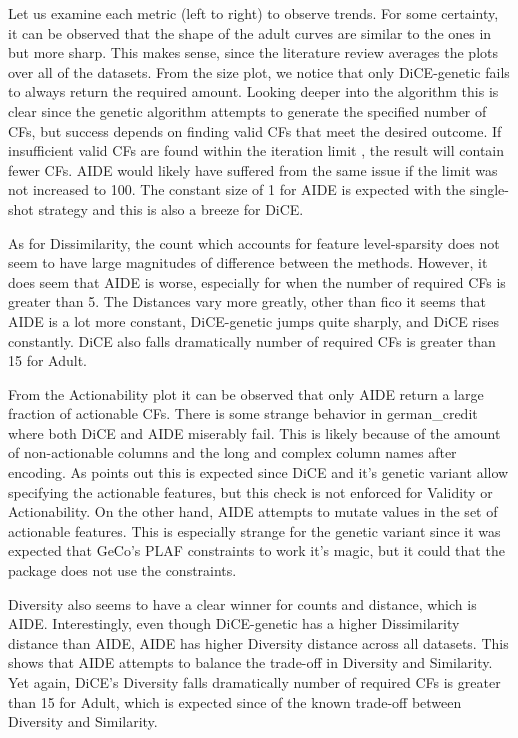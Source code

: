 Let us examine each metric (left to right) to observe trends. For some certainty, it can be observed that the shape of the adult curves are similar to the ones in \citet{guidotti2024counterfactual} but more sharp. This makes sense, since the literature review averages the plots over all of the datasets. From the size plot, we notice that only DiCE-genetic fails to always return the required amount. Looking deeper into the algorithm this is clear since the genetic algorithm attempts to generate the specified number of CFs, but success depends on finding valid CFs that meet the desired outcome. If insufficient valid CFs are found within the iteration limit , the result will contain fewer CFs. AIDE would likely have suffered from the same issue if the limit was not increased to 100. The constant size of 1 for AIDE is expected with the single-shot strategy and this is also a breeze for DiCE.

As for Dissimilarity, the count which accounts for feature level-sparsity does not seem to have large magnitudes of difference between the methods. However, it does seem that AIDE is worse, especially for when the number of required CFs is greater than 5. The Distances vary more greatly, other than fico it seems that AIDE is a lot more constant, DiCE-genetic jumps quite sharply, and DiCE rises constantly. DiCE also falls dramatically number of required CFs is greater than 15 for Adult. 

From the Actionability plot it can be observed that only AIDE return a large fraction of actionable CFs. There is some strange behavior in german\_credit where both DiCE and AIDE miserably fail. This is likely because of the amount of non-actionable columns and the long and complex column names after encoding. As \citet{guidotti2024counterfactual} points out this is expected since DiCE and it's genetic variant allow specifying the actionable features, but this check is not enforced for Validity or Actionability. On the other hand, AIDE attempts to mutate values in the set of actionable features. This is especially strange for the genetic variant since it was expected that GeCo's PLAF constraints to work it's magic, but it could that the package does not use the constraints. 

Diversity also seems to have a clear winner for counts and distance, which is AIDE. Interestingly, even though DiCE-genetic has a higher Dissimilarity distance than AIDE, AIDE has higher Diversity distance across all datasets. This shows that AIDE attempts to balance the trade-off in Diversity and Similarity. Yet again, DiCE's Diversity falls dramatically number of required CFs is greater than 15 for Adult, which is expected since of the known trade-off between Diversity and Similarity. 

